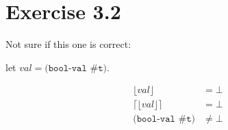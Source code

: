 \section*{Exercise 3.2}

Not sure if this one is correct:

let $val = \texttt{(bool-val \#t)}$.

\begin{align*}
    \lfloor val \rfloor & = \bot \\
    \lceil \lfloor val \rfloor \rceil  & = \bot \\
    \texttt{(bool-val \#t)} & \neq \bot
\end{align*}
